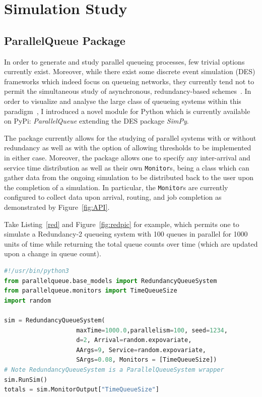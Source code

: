 \chapter{Simulation Study}\label{ch:simulation-study}


\section{ParallelQueue Package}\label{sec:parallelqueue-package}
In order to generate and study parallel queueing processes, few trivial options currently exist.
Moreover, while there exist some discrete event simulation (DES) frameworks which indeed focus on queueing networks, they currently tend not to permit the simultaneous study of asynchronous, redundancy-based schemes~\cite{noauthor_ciwpythonciw_nodate}.
In order to visualize and analyse the large class of queueing systems within this paradigm~\cite{shneer_large-scale_2020,cruise_stability_2020}, I introduced a novel module for Python which is currently available on PyPi: \textit{ParallelQueue} extending the DES package \textit{SimPy}.

The package currently allows for the studying of parallel systems with or without redundancy as well as with the option of allowing thresholds to be implemented in either case.
Moreover, the package allows one to specify any inter-arrival and service time distribution as well as their own \lstinline{Monitor}s, being a class which can gather data from the ongoing simulation to be distributed back to the user upon the completion of a simulation.
In particular, the \lstinline{Monitor}s are currently configured to collect data upon arrival, routing, and job completion as demonstrated by Figure~\ref{fig:API}.

Take Listing~\ref{red} and Figure~\ref{fig:redpic} for example, which permits one to simulate a Redundancy-2 queueing system with 100 queues in parallel for 1000 units of time while returning the total queue counts over time (which are updated upon a change in queue count).


    \begin{lstlisting}[label={fig:red}, caption={Python code using \textit{ParallelQueue} to simulate a Redundancy-2 System.}, language=Python, style=mystyle]
#!/usr/bin/python3
from parallelqueue.base_models import RedundancyQueueSystem
from parallelqueue.monitors import TimeQueueSize
import random

sim = RedundancyQueueSystem(
                    maxTime=1000.0,parallelism=100, seed=1234,
                    d=2, Arrival=random.expovariate,
                    AArgs=9, Service=random.expovariate,
                    SArgs=0.08, Monitors = [TimeQueueSize])
# Note RedundancyQueueSystem is a ParallelQueueSystem wrapper
sim.RunSim()
totals = sim.MonitorOutput["TimeQueueSize"]
    \end{lstlisting}

